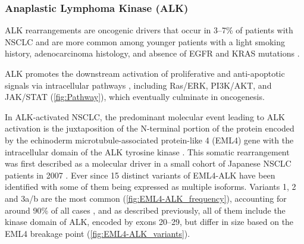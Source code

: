 \subsubsection{Anaplastic Lymphoma Kinase (ALK)} \label{sec:ALK}

ALK rearrangements are oncogenic drivers that occur in 3–7\% of patients with NSCLC and are more common among younger patients with a light smoking history, adenocarcinoma histology, and absence of EGFR and KRAS mutations \cite{NSCLC_drivers, AD_drivers}.

ALK promotes the downstream activation of proliferative and anti-apoptotic signals via intracellular pathways \cite{ALK_fusions, EML4_ALK}, including Ras\slash ERK, PI3K\slash AKT, and JAK\slash STAT (\autoref{fig:Pathway}), which eventually culminate in oncogenesis.

In ALK-activated NSCLC, the predominant molecular event leading to ALK activation is the juxtaposition of the N-terminal portion of the protein encoded by the echinoderm microtubule-associated protein-like 4 (EML4) gene with the intracellular domain of the ALK tyrosine kinase \cite{ALK_identification}. This somatic rearrangement was first described as a molecular driver in a small cohort of Japanese NSCLC patients in 2007 \cite{ALK_identification}. Ever since 15 distinct variants of EML4-ALK have been identified with some of them being expressed as multiple isoforms. Variants 1, 2 and 3a\slash b are the most common  (\autoref{fig:EML4-ALK_frequency}), accounting for around 90\% of all cases \cite{EML4_ALK_variants}, and as described previously, all of them include the kinase domain of ALK, encoded by exons 20–29, but differ in size based on the EML4 breakage point  (\autoref{fig:EML4-ALK_variants}).

